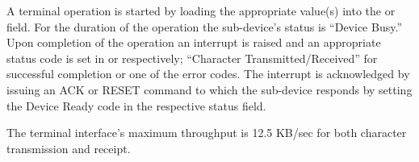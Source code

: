 A terminal operation is started by loading the appropriate value(s) into the \linebreak {} or  field. 
For the duration of the operation the sub-device’s status is “Device Busy.” 
Upon completion of the operation an interrupt is raised and an appropriate status code is set in  or  respectively; “Character Transmitted/Received” for successful completion or one of the error codes. 
The interrupt is acknowledged by issuing an ACK or RESET command to which the sub-device responds by setting the Device Ready code in the respective status field.

The terminal interface’s maximum throughput is 12.5 KB/sec for both character transmission and receipt.


